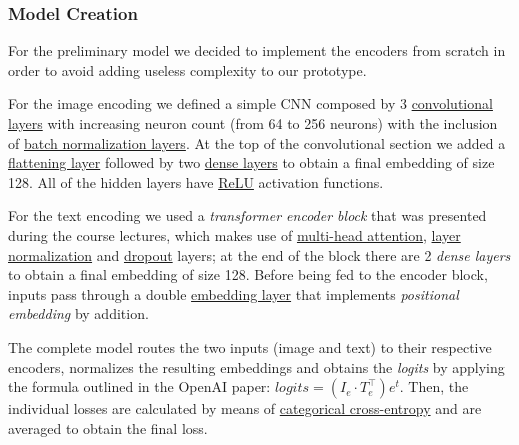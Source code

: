 \documentclass[10pt,twocolumn,letterpaper]{article}
\begin{document}

\subsubsection{Model Creation}
For the preliminary model we decided to implement the encoders from scratch in order to avoid adding useless complexity to our prototype.

For the image encoding we defined a simple CNN composed by 3 \href{https://www.tensorflow.org/api_docs/python/tf/keras/layers/Conv2D}{convolutional layers} with increasing neuron count (from 64 to 256 neurons) with the inclusion of \href{https://www.tensorflow.org/api_docs/python/tf/keras/layers/BatchNormalization}{batch normalization layers}.
At the top of the convolutional section we added a \href{https://www.tensorflow.org/api_docs/python/tf/keras/layers/Flatten}{flattening layer} followed by two \href{https://www.tensorflow.org/api_docs/python/tf/keras/layers/Dense}{dense layers} to obtain a final embedding of size 128.
All of the hidden layers have \href{https://www.tensorflow.org/api_docs/python/tf/keras/layers/ReLU}{ReLU} activation functions.

For the text encoding we used a \textit{transformer encoder block} that was presented during the course lectures, which makes use of \href{https://www.tensorflow.org/api_docs/python/tf/keras/layers/MultiHeadAttention}{multi-head attention}, \href{https://www.tensorflow.org/api_docs/python/tf/keras/layers/LayerNormalization}{layer normalization} and \href{https://www.tensorflow.org/api_docs/python/tf/keras/layers/Dropout}{dropout} layers; at the end of the block there are 2 \textit{dense layers} to obtain a final embedding of size 128.
Before being fed to the encoder block, inputs pass through a double \href{https://www.tensorflow.org/api_docs/python/tf/keras/layers/Embedding}{embedding layer} that implements \textit{positional embedding} by addition.

The complete model routes the two inputs (image and text) to their respective encoders, normalizes the resulting embeddings and obtains the \textit{logits} by applying the formula outlined in the OpenAI paper: $logits = (I_e \cdot T_e^{\top})e^t$.
Then, the individual losses are calculated by means of \href{https://www.tensorflow.org/api_docs/python/tf/keras/losses/CategoricalCrossentropy}{categorical cross-entropy} and are averaged to obtain the final loss.
\end{document}
